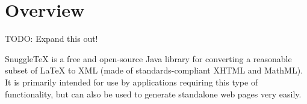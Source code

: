 
\section*{Overview}

TODO: Expand this out!

SnuggleTeX is a free and open-source Java library for converting a
reasonable subset of LaTeX to XML (made of standards-compliant XHTML and MathML).
It is primarily intended for use by applications requiring this type of
functionality, but can also be used to generate standalone web pages very
easily.
